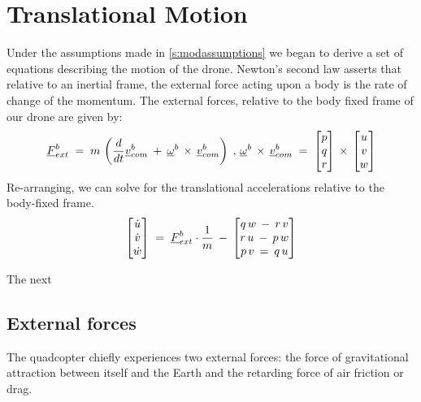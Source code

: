 
\section{Translational Motion}

Under the assumptions made in \cref{s:modassumptions} we began to derive a set of equations describing the motion of the drone. Newton's second law asserts that relative to an inertial frame, the external force acting upon a body is the rate of change of the momentum. The external forces, relative to the body fixed frame of our drone are given by:
\begin{align*}\label{eq:newtonsecond}
	\colvec{F}^b_{ext}\;&=\;m\,\left(\frac{d}{dt}\colvec{v}^b_{com}\:+\:\colvec{\omega}^b\,\times\,\colvec{v}^b_{com}\right)\;,\,
	\colvec{\omega}^b\,\times\,\colvec{v}^b_{com}\;=\;\begin{bmatrix*}p\\q\\r\end{bmatrix*}\,\times\,\begin{bmatrix*}u\\v\\w\end{bmatrix*}\\
\end{align*}
Re-arranging, we can solve for the translational accelerations relative to the body-fixed frame.
\begin{align*}
	\begin{bmatrix}\dot{u}\\\dot{v}\\\dot{w}\end{bmatrix}\;=\;\colvec{F}^b_{ext}\cdot\frac{1}{m}\:-\:\begin{bmatrix*}q\,w\:-\:r\,v\\r\,u\:-\:p\,w\\p\,v\:=\:q\,u\end{bmatrix*}
\end{align*}

The next

\subsection{External forces}
The quadcopter chiefly experiences two external forces: the force of gravitational attraction between itself and the Earth and the retarding force of air friction or drag.
